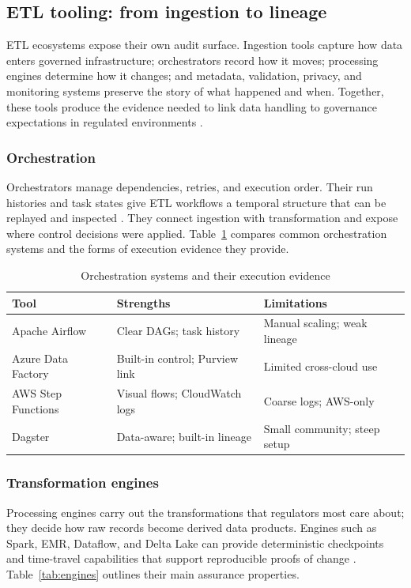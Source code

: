 \subsection*{ETL tooling: from ingestion to lineage}
\noindent
ETL ecosystems expose their own audit surface. Ingestion tools capture how data
enters governed infrastructure; orchestrators record how it moves; processing
engines determine how it changes; and metadata, validation, privacy, and
monitoring systems preserve the story of what happened and when. Together,
these tools produce the evidence needed to link data handling to governance
expectations in regulated environments
\cite{sreepathy_data_2024, mahmud_role_2022,
elbaghazaoui_metadata_2025, yang_impact_2025}.


\subsubsection*{Orchestration}
Orchestrators manage dependencies, retries, and execution order. Their run
histories and task states give ETL workflows a temporal structure that can be
replayed and inspected \cite{sreepathy_data_2024, mahmud_role_2022}. They
connect ingestion with transformation and expose where control decisions were
applied. Table~\ref{tab:orchestration} compares common orchestration systems and
the forms of execution evidence they provide.

\begin{table}[h]
  \centering
  \caption{Orchestration systems and their execution evidence}
  \label{tab:orchestration}
  \begin{tabular}{@{}lll@{}}
    \toprule
    Tool & Strengths & Limitations \\
    \midrule
    Apache Airflow & Clear DAGs; task history & Manual scaling; weak lineage \\
    Azure Data Factory & Built-in control; Purview link & Limited cross-cloud use \\
    AWS Step Functions & Visual flows; CloudWatch logs & Coarse logs; AWS-only \\
    Dagster & Data-aware; built-in lineage & Small community; steep setup \\
    \bottomrule
  \end{tabular}
\end{table}


\subsubsection*{Transformation engines}
Processing engines carry out the transformations that regulators most care
about; they decide how raw records become derived data products. Engines such as
Spark, EMR, Dataflow, and Delta Lake can provide deterministic checkpoints and
time-travel capabilities that support reproducible proofs of change
\cite{mohna_ai-ready_2022, mahmud_role_2022}. Table~\ref{tab:engines} outlines
their main assurance properties.

